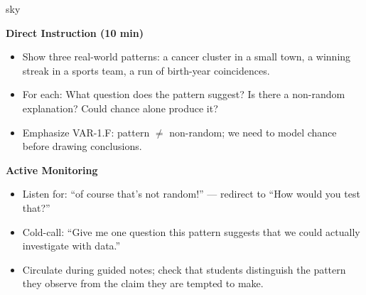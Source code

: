 \documentclass[10pt]{article}
\begin{document}
\begin{skillbox}{sky}
\begin{minipage}[t]{0.48\linewidth}
    \textbf{Direct Instruction (10 min)}
    \begin{itemize}
        \item Show three real-world patterns: a cancer cluster in a small town, a
              winning streak in a sports team, a run of birth-year coincidences.
        \item For each: What question does the pattern suggest? Is there a non-random
              explanation? Could chance alone produce it?
        \item Emphasize VAR-1.F: pattern $\neq$ non-random; we need to model chance
              before drawing conclusions.
    \end{itemize}
\end{minipage}
\hfill
\begin{minipage}[t]{0.48\linewidth}
    \textbf{Active Monitoring}
    \begin{itemize}
        \item Listen for: ``of course that's not random!'' — redirect to ``How would you
              test that?''
        \item Cold-call: ``Give me one question this pattern suggests that we could
              actually investigate with data.''
        \item Circulate during guided notes; check that students distinguish the pattern
              they observe from the claim they are tempted to make.
    \end{itemize}
\end{minipage}
\end{skillbox}
\end{document}
